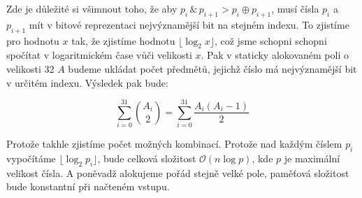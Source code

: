 \documentclass{fkssolpub}
\author{Ondřej Sedláček}
\begin{document}
Zde je důležité si všimnout toho, že aby $p_i \, \& \, p_{i+1} > p_i \oplus p_{i+1}$,
musí čísla $p_i$ a $p_{i+1}$ mít v bitové reprezentaci nejvýznamější bit na
stejném indexu. To zjistíme pro hodnotu $x$ tak, že zjistíme hodnotu
$\lfloor \log_2 x \rfloor$, což jsme schopni schopni spočítat v logaritmickém čase
vůči velikosti $x$. Pak v staticky alokovaném poli o velikosti
32 $A$ budeme ukládat počet předmětů, jejichž číslo má nejvýznamější bit v určitém
indexu. Výsledek pak bude:

\[
	\sum_{i=0}^{31} \binom{A_i}{2} = \sum_{i=0}^{31} \frac{A_i (A_i - 1)}{2}
\]

Protože takhle zjistíme počet možných kombinací. Protože nad každým číslem $p_i$
vypočítáme $\lfloor \log_2 p_i \rfloor$, bude celková složitost $\mathcal{O}(n \log p)$,
kde $p$ je maximální velikost čísla. A poněvadž alokujeme pořád stejně velké pole,
paměťová složitost bude konstantní při načteném vstupu.
\end{document}
